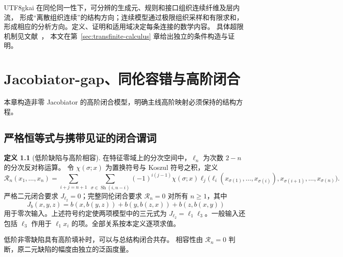 \documentclass[12pt]{report}
\theoremstyle{definition}
\newtheorem{definition}{定义}[chapter]
\begin{document}
\begin{CJK*}{UTF8}{gkai}
在同伦同一性下，可分辨的生成元、规则和接口组织连续纤维及层内流，
形成“离散组织连续”的结构方向；连续模型通过极限组织采样和有限求和，
形成相应的分析方向。定义、证明和适用域决定每条连接的数学内容。
具体超限机制见文献~\cite{homotopyworkflow,repairdepth}，
本文在第~\ref{sec:transfinite-calculus} 章给出独立的条件构造与证明。

\chapter{Jacobiator-gap、同伦容错与高阶闭合}
\label{sec:rich-closure}
本章构造非零 Jacobiator 的高阶闭合模型，明确主线高阶映射必须保持的结构方程。

\section{严格恒等式与携带见证的闭合谓词}
\begin{definition}[低阶缺陷与高阶相容]
在特征零域上的分次空间中，\(\ell_n\) 为次数 \(2-n\) 的分次反对称运算。
令 \(\chi(\sigma;x)\) 为置换符号与 Koszul 符号之积，定义
\[
\mathcal R_n(x_1,\ldots,x_n)=
\sum_{i+j=n+1}\ \sum_{\sigma\in\operatorname{Sh}(i,n-i)}
(-1)^{i(j-1)}\chi(\sigma;x)
\ell_j\bigl(\ell_i(x_{\sigma(1)},\ldots,x_{\sigma(i)}),
 x_{\sigma(i+1)},\ldots,x_{\sigma(n)}\bigr).
\]
严格二元闭合要求 \(J_{\ell_2}=0\)；完整同伦闭合要求
\(\mathcal R_n=0\) 对所有 \(n\ge1\)，其中
\[
J_b(x,y,z)=b(x,b(y,z))+b(y,b(z,x))+b(z,b(x,y))
\]
用于零次输入。上述符号约定使两项模型中的三元式为
\(J_{\ell_2}=\ell_1\ell_3\)。一般输入还包括 \(\ell_3\) 作用于
\(\ell_1x_i\) 的项。全部关系按本定义逐项求值\cite{ladamarkl,pure}。
\end{definition}
低阶非零缺陷具有高阶填补时，可以与总结构闭合共存。
相容性由 \(\mathcal R_n=0\) 判断，原二元缺陷的幅度由独立的泛函度量。


\end{CJK*}
\end{document}
